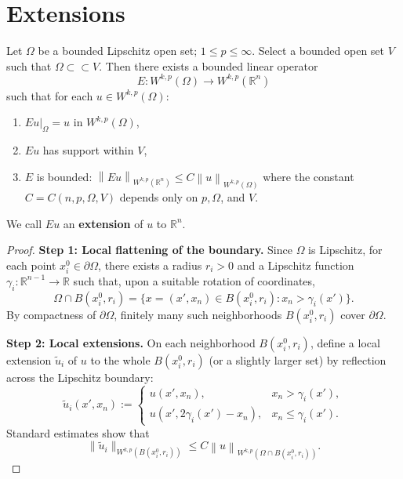 \section{Extensions}
\begin{theorem}
    \label{thm:extension}
    Let $\Omega $ be a bounded Lipschitz open set; $1 \leq p \leq \infty$. Select a bounded open set \( V \) such that \( \Omega \subset \subset V \). Then there exists a bounded linear operator
    \begin{equation*}
        E : W^{k,p}\left(\Omega\right) \longrightarrow W^{k,p}(\mathbb{R}^n)
    \end{equation*}
    such that for each \( u \in W^{k,p}\left(\Omega\right) \):
    \begin{enumerate}[label=(\roman*)]
        \item
              \( Eu|_\Omega = u  \text{ in }  W^{k,p}\left(\Omega\right) \),
        \item
              \( Eu \) has support within \( V \),
        \item
              $E$ is bounded: \(\left\|Eu\right\|_{W^{k,p}(\mathbb{R}^n)} \leq C\left\|u\right\|_{W^{k,p}\left(\Omega\right)}\)
              where the constant \( C=C\left(n,p,\Omega,V\right) \) depends only on  $p, \Omega$, and $V$.
    \end{enumerate}
    We call \( Eu \) an \textbf{extension} of \( u \) to \( \mathbb{R}^n \).
    \begin{proof}
        \textbf{Step 1: Local flattening of the boundary.}
        Since $\Omega$ is Lipschitz, for each point $x_i^0 \in \partial \Omega$, there exists a radius $r_i>0$ and a Lipschitz function $\gamma_i:\mathbb{R}^{n-1}\to \mathbb{R}$ such that, upon a suitable rotation of coordinates,
        \[
            \Omega \cap B(x_i^0,r_i) = \{ x=(x',x_n) \in B(x_i^0,r_i) : x_n > \gamma_i(x') \}.
        \]
        By compactness of $\partial \Omega$, finitely many such neighborhoods $B(x_i^0,r_i)$ cover $\partial \Omega$.

        \medskip

        \textbf{Step 2: Local extensions.}
        On each neighborhood $B(x_i^0,r_i)$, define a local extension $\tilde{u}_i$ of $u$ to the whole $B(x_i^0,r_i)$ (or a slightly larger set) by reflection across the Lipschitz boundary:
        \[
            \tilde{u}_i(x',x_n) :=
            \begin{cases}
                u(x',x_n),                   & x_n > \gamma_i(x'),   \\
                u(x', 2 \gamma_i(x') - x_n), & x_n \le \gamma_i(x').
            \end{cases}
        \]
        Standard estimates show that
        \[
            \|\tilde{u}_i\|_{W^{k,p}(B(x_i^0,r_i))} \le C \left\|u\right\|_{W^{k,p}(\Omega \cap B(x_i^0,r_i))}.
        \]


\end{proof}
\end{theorem}
